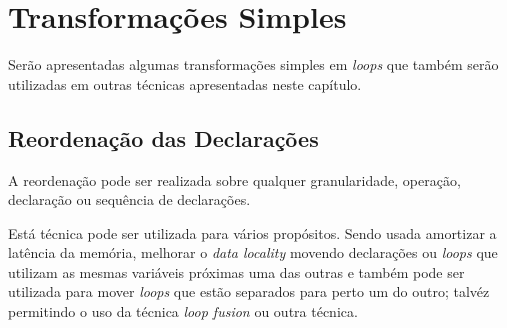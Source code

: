 
\section{Transformações Simples}

Serão apresentadas algumas transformações simples em \textit{loops} que também
serão utilizadas em outras técnicas apresentadas neste capítulo.

\subsection{Reordenação das Declarações}

A reordenação pode ser realizada sobre qualquer granularidade, operação,
declaração ou sequência de declarações.

Está técnica pode ser utilizada para vários propósitos. Sendo usada amortizar a
latência da memória, melhorar o \textit{data locality} movendo declarações ou
\textit{loops} que utilizam as mesmas variáveis próximas uma das outras e também
pode ser utilizada para mover \textit{loops} que estão separados para perto um
do outro; talvéz permitindo o uso da técnica \textit{loop fusion} ou outra 
técnica.
